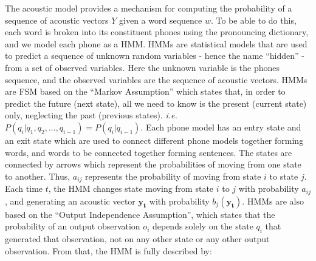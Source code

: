 The acoustic model provides a mechanism for computing the probability of a sequence of acoustic vectors $Y$ given a word sequence $w$. 
To be able to do this, each word is broken into its constituent phones using the pronouncing dictionary, and we model each phone as a \ac{HMM}. \ac{HMM}s are statistical models that are used to predict a sequence of unknown random variables - hence the name \enquote{hidden} -  from a set of observed variables. Here the unknown variable is the phones sequence, and the observed variables are the sequence of acoustic vectors. \ac{HMM}s are \ac{FSM} based on the \enquote{Markov Assumption} which states that, in order to predict the future (next state), all we need to know is the present  (current state) only, neglecting the past (previous states). \textit{i.e.} $ P(q_i|q_1,q_2,...,q_{i-1}) = P(q_i|q_{i-1}) $. Each phone model has an entry state and an exit state which are used to connect different phone models together forming words, and words to be connected together forming sentences. The states are connected by arrows which represent the probabilities of moving from one state to another. Thus, $a_{ij}$ represents the probability of moving from state $i$ to state $j$. Each time $t$, the \ac{HMM} changes state moving from state $i$ to $j$ with probability $a_{ij}$, and generating an acoustic vector $\mathbf{y_t}$ with probability $b_j(\mathbf{y_t})$. \ac{HMM}s are also based on the \enquote{Output Independence Assumption}, which states that the probability of an output observation $o_i$ depends solely on the state $q_i$ that generated that observation, not on any other state or any other output observation. From that, the \ac{HMM} is fully described by:


